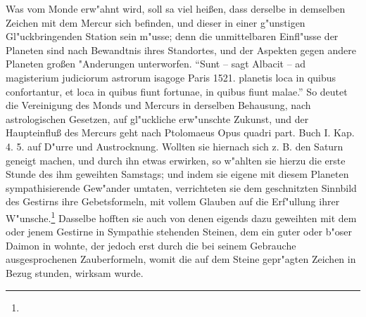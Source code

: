 \documentclass[a4paper, 11pt, oneside, polutonikogreek, german]{article}
\begin{document}
{\hspace*{0.5cm} Was vom Monde erw"ahnt wird, soll sa viel heißen, dass derselbe in demselben Zeichen mit dem Mercur sich befinden, und dieser in einer g"unstigen Gl"uckbringenden Station sein m"usse; denn die unmittelbaren Einfl"usse der Planeten sind nach Bewandtnis ihres Standortes, und der Aspekten gegen andere Planeten großen "Anderungen unterworfen. "`Sunt -- sagt Albacit -- ad magisterium judiciorum astrorum isagoge Paris 1521. planetis loca in quibus confortantur, et loca in quibus fiunt fortunae, in quibus fiunt malae."' So deutet die Vereinigung des Monds und Mercurs in derselben Behausung, nach astrologischen Gesetzen, auf gl"uckliche erw"unschte Zukunst, und der Haupteinfluß des Mercurs geht nach Ptolomaeus Opus quadri part. Buch I. Kap. 4. 5. auf D"urre und Austrocknung.} Wollten sie hiernach sich z. B. den Saturn geneigt machen, und durch ihn etwas erwirken, so w"ahlten sie hierzu die erste Stunde des ihm geweihten Samstags; und indem sie eigene mit diesem Planeten sympathisierende Gew"ander umtaten, verrichteten sie dem geschnitzten Sinnbild des Gestirns ihre Gebetsformeln, mit vollem Glauben auf die Erf"ullung ihrer W"unsche.\footnote{} Dasselbe hofften sie auch von denen eigends dazu geweihten mit dem oder jenem Gestirne in Sympathie stehenden Steinen, dem ein guter oder b"oser Daimon in wohnte, der jedoch erst durch die bei seinem Gebrauche ausgesprochenen Zauberformeln, womit die auf dem Steine gepr"agten Zeichen in Bezug stunden, wirksam wurde.
\end{document}
